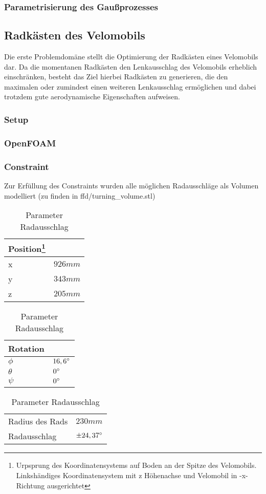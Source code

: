 \subsubsection{Parametrisierung des Gaußprozesses}


\subsection{Radkästen des Velomobils}

Die erste Problemdomäne stellt die Optimierung der Radkästen eines Velomobils dar.
Da die momentanen Radkästen den Lenkausschlag des Velomobils erheblich einschränken, besteht das Ziel hierbei Radkästen zu generieren, die den maximalen oder zumindest einen weiteren Lenkausschlag ermöglichen und dabei trotzdem gute aerodynamische Eigenschaften aufweisen.

\subsubsection{Setup}
\subsubsection{OpenFOAM}
\subsubsection{Constraint}
Zur Erfüllung des Constraints wurden alle möglichen Radausschläge als Volumen modelliert (zu finden in ffd/turning\_volume.stl)

\begin{table}[h]
	\begin{tabularx}{.5\textwidth}{ll}\hline
		
		Position\footnote{Urpsprung des Koordinatensystems auf Boden an der Spitze des Velomobils. Linkshändiges Koordinatensystem mit z Höhenachse und Velomobil in -x-Richtung ausgerichtet} & \\
		\hline
		x &	$926mm$ \\
		y &	$343mm$ \\
		z &	$205mm$	\\
	\end{tabularx}
	\begin{tabularx}{.5\textwidth}{ll}\hline
		Rotation & \\ \hline
		$\phi$ & $16,6\degree$ \\
		$\theta$ & $0\degree$ \\
		$\psi$ & $0\degree$ \\
	\end{tabularx}
	\begin{tabularx}{.5\linewidth}{ll}
		Radius des Rads & $230mm$ \\
		Radausschlag & $\pm24,37\degree$\\
		
	\end{tabularx}

\label{tab:wheel_params}
\caption{Parameter Radausschlag}
\end{table}


